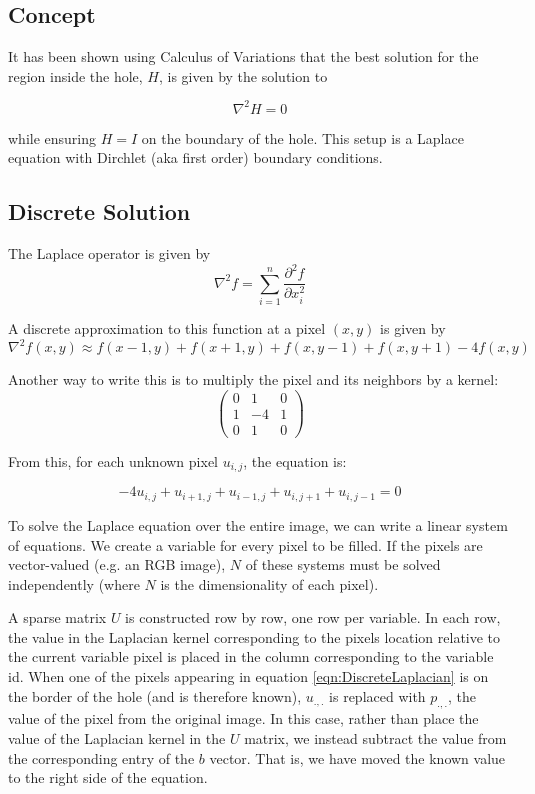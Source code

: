 \documentclass{InsightArticle}
\begin{document}
\subsection{Concept}
It has been shown using Calculus of Variations that the best solution for the region inside the hole, $H$, is given by the solution to 

\begin{equation}
\nabla^2 H = 0
\end{equation}

while ensuring $H=I$ on the boundary of the hole. This setup is a Laplace equation with Dirchlet (aka first order) boundary conditions. 

\subsection{Discrete Solution}
The Laplace operator is given by
\begin{equation}
 \nabla^2 f = \sum_{i=1}^n \frac{\partial^2 f}{\partial x_i^2}
\end{equation}

A discrete approximation to this function at a pixel $(x,y)$ is given by
\begin{equation}
 \nabla^2 f(x,y) \approx f(x-1,y) + f(x+1,y) + f(x,y-1) + f(x,y+1) - 4f(x,y)
\end{equation}

Another way to write this is to multiply the pixel and its neighbors by a kernel:
\begin{equation}
\begin{pmatrix}
0 & 1 & 0 \\
1 & -4 & 1\\
0 & 1 & 0
\end{pmatrix}
\end{equation}


From this, for each unknown pixel $u_{i,j}$, the equation is:

\begin{equation}
\label{eqn:DiscreteLaplacian}
-4 u_{i,j} + u_{i+1,j} + u_{i-1,j} + u_{i,j+1} + u_{i,j-1} = 0
\end{equation}

To solve the Laplace equation over the entire image, we can write a linear system of equations. We create a variable for every pixel to be filled. If the pixels are vector-valued (e.g. an RGB image), $N$ of these systems must be solved independently (where $N$ is the dimensionality of each pixel).

A sparse matrix $U$ is constructed row by row, one row per variable. In each row, the value in the Laplacian kernel corresponding to the pixels location relative to the current variable pixel is placed in the column corresponding to the variable id. When one of the pixels appearing in equation \ref{eqn:DiscreteLaplacian} is on the border of the hole (and is therefore known), $u_{.,.}$ is replaced with $p_{.,.}$, the value of the pixel from the original image. In this case, rather than place the value of the Laplacian kernel in the $U$ matrix, we instead subtract the value from the corresponding entry of the $b$ vector. That is, we have moved the known value to the right side of the equation.
\end{document}
